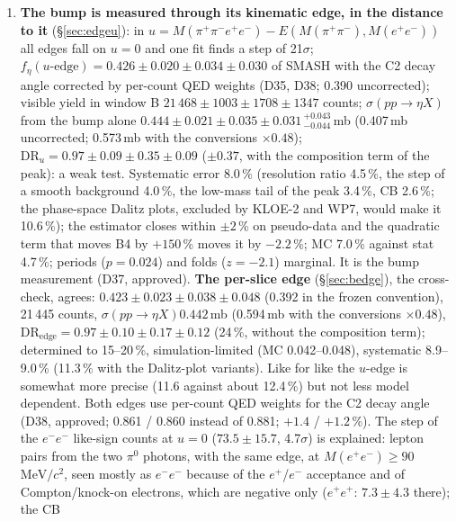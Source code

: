 \documentclass[11pt,a4paper]{article}
\newcommand{\piz}{\ensuremath{\pi^{0}}\xspace}
\newcommand{\Mfour}{\ensuremath{M(\pi^{+}\pi^{-}e^{+}e^{-})}\xspace}
\newcommand{\Mee}{\ensuremath{M(e^{+}e^{-})}\xspace}
\newcommand{\Mpipi}{\ensuremath{M(\pi^{+}\pi^{-})}\xspace}
\newcommand{\MeVcc}{\ensuremath{\mathrm{MeV}/c^{2}}\xspace}
\newcommand{\sigeta}{\ensuremath{\sigma(pp\to\eta X)}\xspace}
\begin{document}
\begin{enumerate}
      side-band value). It is below the published HADES
      inclusive values at 3.5\,GeV (1.14 / 0.93\,mb). The event-vertex cut is not the cause (item 7); no significance is quoted because the
      composition of the peak is not resolved; it is taken from the data provisionally (D31, ruled) until the separate test of D32.
\item \textbf{The bump is measured through its kinematic edge, in the distance to it} (\S\ref{sec:edgeu}): in $u=\Mfour-E(\Mpipi,\Mee)$ all
      edges fall on $u=0$ and one fit finds a step of 21$\sigma$; $f_\eta(u\text{-edge})=0.426\pm0.020\pm0.034\pm0.030$ of SMASH with the C2 decay
      angle corrected by per-count QED weights (D35, D38; 0.390 uncorrected); visible yield in window B $21\,468\pm1003\pm1708\pm1347$ counts;
      \sigeta from the bump alone $0.444\pm0.021\pm0.035\pm0.031\,^{+0.043}_{-0.044}$\,mb (0.407\,mb uncorrected; 0.573\,mb with the conversions
      $\times0.48$); $\mathrm{DR}_u=0.97\pm0.09\pm0.35\pm0.09$ ($\pm0.37$, with the composition term of the peak): a weak test. Systematic error
      8.0\,\% (resolution ratio 4.5\,\%, the step of a smooth background 4.0\,\%, the low-mass tail of the peak 3.4\,\%, CB 2.6\,\%; the phase-space
      Dalitz plots, excluded by KLOE-2 and WP7, would make it 10.6\,\%); the estimator closes within $\pm2$\,\% on pseudo-data and the quadratic term
      that moves B4 by $+150$\,\% moves it by $-2.2$\,\%; MC 7.0\,\% against stat 4.7\,\%; periods ($p=0.024$) and folds ($z=-2.1$) marginal.
      It is the bump measurement (D37, approved). \textbf{The per-slice edge} (\S\ref{sec:bedge}), the cross-check, agrees:
      $0.423\pm0.023\pm0.038\pm0.048$ (0.392 in the frozen convention), 21\,445 counts, \sigeta $0.442$\,mb (0.594\,mb with the conversions
      $\times0.48$), $\mathrm{DR}_{\mathrm{edge}}=0.97\pm0.10\pm0.17\pm0.12$ (24\,\%, without the composition term); determined to 15--20\,\%,
      simulation-limited (MC 0.042--0.048), systematic 8.9--9.0\,\% (11.3\,\% with the Dalitz-plot variants). Like for like the $u$-edge is somewhat
      more precise (11.6 against about 12.4\,\%) but not less model dependent. Both edges use per-count QED weights for the C2 decay angle (D38,
      approved; 0.861 / 0.860 instead of 0.881; $+1.4$ / $+1.2$\,\%). The step of the $e^-e^-$ like-sign counts at $u=0$ ($73.5\pm15.7$,
      4.7$\sigma$) is explained: lepton pairs from the two \piz photons, with the same edge, at \Mee$\ge90$\,\MeVcc, seen mostly as $e^-e^-$
      because of the $e^+$/$e^-$ acceptance and of Compton/knock-on electrons, which are negative only ($e^+e^+$: $7.3\pm4.3$ there); the CB

\end{enumerate}
\end{document}
